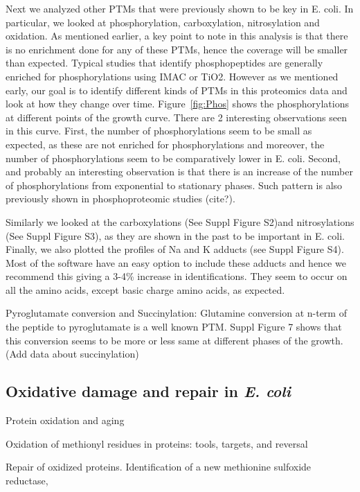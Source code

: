 \documentclass[12pt]{article}
\begin{document}
Next we analyzed other PTMs that were previously shown to be key in E. coli. In particular, we looked at phosphorylation, carboxylation, nitrosylation and oxidation. As mentioned earlier, a key point to note in this analysis is that there is no enrichment done for any of these PTMs, hence the coverage will be smaller than expected. Typical studies that identify phosphopeptides are generally enriched for phosphorylations using IMAC or TiO2. However as we mentioned early, our goal is to identify different kinds of PTMs in this proteomics data and look at how they change over time. Figure~\ref{fig:Phos} shows the phosphorylations at different points of the growth curve. There are 2 interesting observations seen in this curve. First, the number of phosphorylations seem to be small as expected, as these are not enriched for phosphorylations and moreover, the number of phosphorylations seem to be comparatively lower in E. coli. Second, and probably an interesting observation is that there is an increase of the number of phosphorylations from exponential to stationary phases. Such pattern is also previously shown in phosphoproteomic studies (cite?).

Similarly we looked at the carboxylations (See Suppl Figure S2)and nitrosylations (See Suppl Figure S3), as they are shown in the past to be important in E. coli. Finally, we also plotted the profiles of Na and K adducts (see Suppl Figure S4). Most of the software have an easy option to include these adducts and hence we recommend this giving a 3-4\% increase in identifications. They seem to occur on all the amino acids, except basic charge amino acids, as expected.

Pyroglutamate conversion and Succinylation:
Glutamine conversion at n-term of the peptide to pyroglutamate is a well known PTM. Suppl Figure 7 shows that this conversion seems to be more or less same at different phases of the growth. (Add data about succinylation)

\subsection{Oxidative damage and repair in \emph{E. coli}}
\cite{Stadtman1992}
{Protein oxidation and aging}

\cite{Vogt1995}
{Oxidation of methionyl residues in proteins: tools, targets, and reversal}

\cite{Grimaudetal2001}
{Repair of oxidized proteins. Identification of a new methionine sulfoxide reductase},
\end{document}
